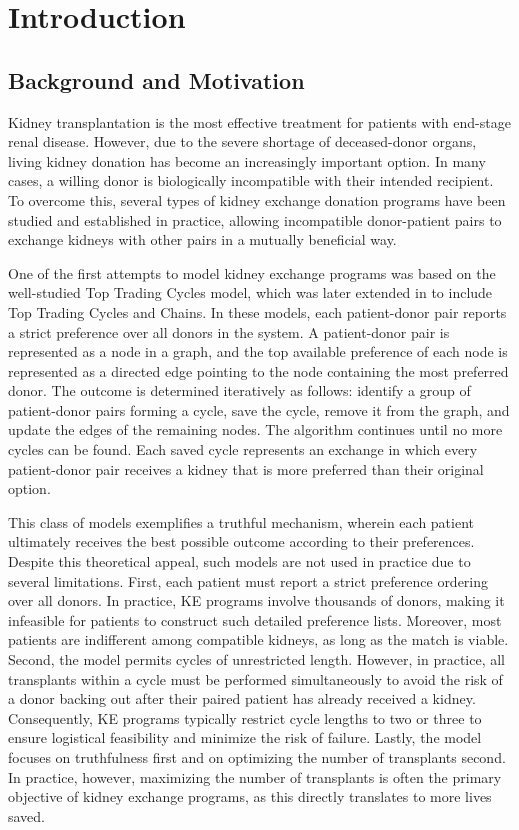 \chapter{Introduction}
\label{cha:introduction}


\section{Background and Motivation}
\label{sec:background_and_motivation}

Kidney transplantation is the most effective treatment for patients with end-stage renal disease. However, due to the severe shortage of deceased-donor organs, living kidney donation has become an increasingly important option. In many cases, a willing donor is biologically incompatible with their intended recipient. To overcome this, several types of kidney exchange donation programs have been studied and established in practice, allowing incompatible donor-patient pairs to exchange kidneys with other pairs in a mutually beneficial way.

One of the first attempts to model kidney exchange programs was based on the well-studied Top Trading Cycles model, which was later extended in \cite{roth2004kidney} to include Top Trading Cycles and Chains. In these models, each patient-donor pair reports a strict preference over all donors in the system. A patient-donor pair is represented as a node in a graph, and the top available preference of each node is represented as a directed edge pointing to the node containing the most preferred donor. The outcome is determined iteratively as follows: identify a group of patient-donor pairs forming a cycle, save the cycle, remove it from the graph, and update the edges of the remaining nodes. The algorithm continues until no more cycles can be found. Each saved cycle represents an exchange in which every patient-donor pair receives a kidney that is more preferred than their original option.

This class of models exemplifies a truthful mechanism, wherein each patient ultimately receives the best possible outcome according to their preferences. Despite this theoretical appeal, such models are not used in practice due to several limitations. First, each patient must report a strict preference ordering over all donors. In practice, \ac{KE} programs involve thousands of donors, making it infeasible for patients to construct such detailed preference lists. Moreover, most patients are indifferent among compatible kidneys, as long as the match is viable. Second, the model permits cycles of unrestricted length. However, in practice, all transplants within a cycle must be performed simultaneously to avoid the risk of a donor backing out after their paired patient has already received a kidney. Consequently, \ac{KE} programs typically restrict cycle lengths to two or three to ensure logistical feasibility and minimize the risk of failure. Lastly, the model focuses on truthfulness first and on optimizing the number of transplants second. In practice, however, maximizing the number of transplants is often the primary objective of kidney exchange programs, as this directly translates to more lives saved.

